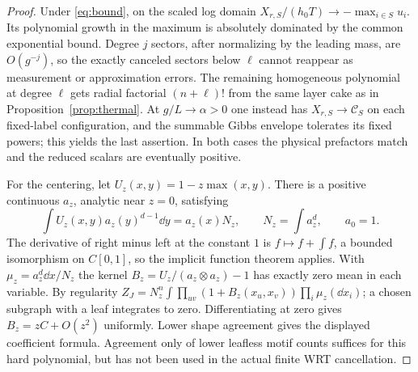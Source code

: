 \begin{proof}
Under \eqref{eq:bound}, on the scaled log domain \(X_{r,S}/(h_0T)\to-\max_{i\in S}u_i\). Its polynomial growth in the maximum is absolutely dominated by the common exponential bound. Degree \(j\) sectors, after normalizing by the leading mass, are \(O(g^{-j})\), so the exactly canceled sectors below \(\ell\) cannot reappear as measurement or approximation errors. The remaining homogeneous polynomial at degree \(\ell\) gets radial factorial \((n+\ell)!\) from the same layer cake as in Proposition~\ref{prop:thermal}. At \(g/L\to\alpha>0\) one instead has \(X_{r,S}\to\mathcal C_S\) on each fixed-label configuration, and the summable Gibbs envelope tolerates its fixed powers; this yields the last assertion. In both cases the physical prefactors match and the reduced scalars are eventually positive.

For the centering, let \(U_z(x,y)=1-z\max(x,y)\). There is a positive continuous \(a_z\), analytic near \(z=0\), satisfying
\[
 \int U_z(x,y)a_z(y)^{d-1}\dd y=a_z(x)N_z,\qquad N_z=\int a_z^d,\qquad a_0=1 .
\]
The derivative of right minus left at the constant \(1\) is \(f\mapsto f+\int f\), a bounded isomorphism on \(C[0,1]\), so the implicit function theorem applies. With \(\mu_z=a_z^d\dd x/N_z\) the kernel \(B_z=U_z/(a_z\otimes a_z)-1\) has exactly zero mean in each variable. By regularity \(Z_J=N_z^n\int\prod_{uv}(1+B_z(x_u,x_v))\prod_i\mu_z(\dd x_i)\); a chosen subgraph with a leaf integrates to zero. Differentiating at zero gives \(B_z=zC+O(z^2)\) uniformly. Lower shape agreement gives the displayed coefficient formula. Agreement only of lower leafless motif counts suffices for this hard polynomial, but has not been used in the actual finite WRT cancellation.


\end{proof}
